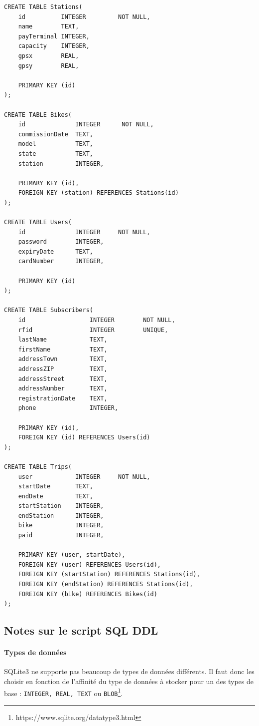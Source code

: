 \documentclass[a4paper]{article}
\begin{document}
\begin{verbatim}
CREATE TABLE Stations(
    id          INTEGER         NOT NULL,
    name        TEXT,
    payTerminal INTEGER,
    capacity    INTEGER,
    gpsx        REAL,
    gpsy        REAL,

    PRIMARY KEY (id)
);

CREATE TABLE Bikes(
    id              INTEGER      NOT NULL,
    commissionDate  TEXT,
    model           TEXT,
    state           TEXT,
    station         INTEGER,

    PRIMARY KEY (id),
    FOREIGN KEY (station) REFERENCES Stations(id)
);

CREATE TABLE Users(
    id              INTEGER     NOT NULL,
    password        INTEGER,
    expiryDate      TEXT,
    cardNumber      INTEGER,

    PRIMARY KEY (id)
);

CREATE TABLE Subscribers(
    id                  INTEGER        NOT NULL,
    rfid                INTEGER        UNIQUE,
    lastName            TEXT,
    firstName           TEXT,
    addressTown         TEXT,
    addressZIP          TEXT,
    addressStreet       TEXT,
    addressNumber       TEXT,
    registrationDate    TEXT,
    phone               INTEGER,

    PRIMARY KEY (id),
    FOREIGN KEY (id) REFERENCES Users(id)
);

CREATE TABLE Trips(
    user            INTEGER     NOT NULL,
    startDate       TEXT,
    endDate         TEXT,
    startStation    INTEGER,
    endStation      INTEGER,
    bike            INTEGER,
    paid            INTEGER,

    PRIMARY KEY (user, startDate),
    FOREIGN KEY (user) REFERENCES Users(id),
    FOREIGN KEY (startStation) REFERENCES Stations(id),
    FOREIGN KEY (endStation) REFERENCES Stations(id),
    FOREIGN KEY (bike) REFERENCES Bikes(id)
);
\end{verbatim}

  \subsection{Notes sur le script SQL DDL}

  \paragraph{Types de données} SQLite3 ne supporte pas beaucoup de types de données différents. Il faut donc les choisir en fonction de l'affinité du type de données à stocker pour un des types de base : \texttt{INTEGER, REAL, TEXT} ou \texttt{BLOB}\footnote{https://www.sqlite.org/datatype3.html}.
  
\end{document}

